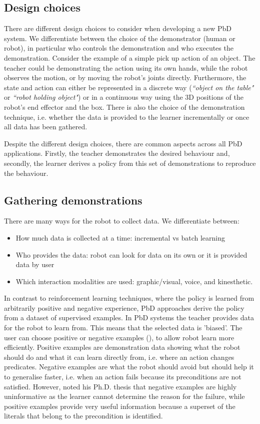 \subsection{Design choices}
There are different design choices to consider when developing a new PbD system.
We differentiate between the choice of the demonstrator (human or robot), in particular who controls the demonstration and who executes the demonstration.
 Consider the example of a simple pick up action of an object.
 The teacher could be demonstrating the action using its own hands, while the robot observes the motion, or by moving the robot's joints directly.
 Furthermore, the state and action can either be represented in a discrete way (\textit{``object on the table"} or \textit{``robot holding object"}) or in a continuous way using the 3D positions of the robot's end effector and the box.
 There is also the choice of the demonstration technique, i.e. whether the data is provided to the learner incrementally or once all data has been gathered.
 
Despite the different design choices, there are common aspects across all PbD applications. Firstly, the teacher demonstrates the desired behaviour and, secondly, the learner derives a policy from this set of demonstrations to reproduce the behaviour.

\subsection{Gathering demonstrations} \label{subsec:Gathering demonstrations}
There are many ways for the robot to collect data.
 We differentiate between:
\begin{itemize}
    \item How much data is collected at a time: incremental vs batch learning
    \item Who provides the data: robot can look for data on its own or it is provided data by user
    \item Which interaction modalities are used: graphic/visual, voice, and kinesthetic. 
\end{itemize}

In contrast to reinforcement learning techniques, where the policy is learned from arbitrarily positive and negative experience, PbD approaches derive the policy from a dataset of supervised examples.
In PbD systems the teacher provides data for the robot to learn from.
This means that the selected data is 'biased'. 
The user can choose positive or negative examples (\cite{grollman2012robot}), to allow robot learn more efficiently.
Positive examples are demonstration data showing what the robot should do and what it can learn directly from, i.e. where an action changes predicates.
Negative examples are what the robot should avoid but should help it to generalise faster, i.e. when an action fails because its preconditions are not satisfied.
However, \cite{walsh2010efficient} noted his Ph.D. thesis that negative examples are highly uninformative as the learner cannot determine the reason for the failure, while positive examples provide very useful information because a superset of the literals that belong to the precondition is identified.

